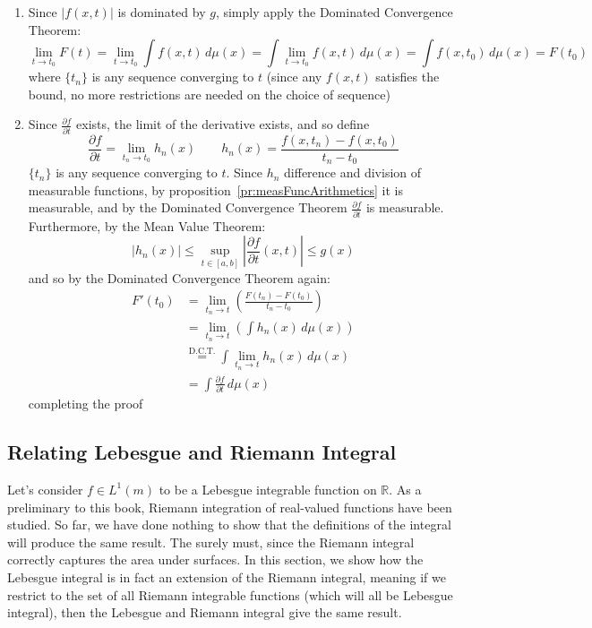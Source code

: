 \documentclass[oneside]{book}
\newcommand{\R}{\mathbb{R}}
\newcommand{\rw}{\rightarrow}
\begin{document}
\begin{Proof}
	\begin{enumerate}
		\item Since $|f(x,t)|$ is dominated by $g$, simply apply the Dominated Convergence Theorem:
			\[
				\lim_{t \rw t_0} F(t) = \lim_{t \rw t_0}\int f(x, t)\,d\mu(x) = \int\lim_{t \rw t_0} f(x, t)\,d\mu(x) = \int
				f(x,t_0)\,d\mu(x) = F(t_0)
			\]
			where $\{t_n\}$ is any sequence converging to $t$ (since any $f(x,t)$ satisfies the bound, no more
			restrictions are needed on the choice of sequence)
		\item Since $\frac{\partial f}{\partial t}$ exists, the limit of the derivative exists, and so define
			\[
				\frac{\partial f}{\partial t} = \lim_{t_n \rw t_0} h_n(x) \qquad h_n(x) = \frac{f(x, t_n) - f(x, t_0)}{t_n - t_0}
			\]
			$\{t_n\}$ is any sequence converging to $t$. Since $h_n$ difference and division of measurable functions, by
			proposition~\ref{pr:measFuncArithmetics} it is measurable, and by the Dominated Convergence Theorem
			$\frac{\partial f}{\partial t}$ is measurable. Furthermore, by the Mean Value Theorem:
			\[
				|h_n(x)| \le \sup_{t \in [a,b]} \left|\frac{\partial f}{\partial t}(x,t)\right| \le g(x)
			\]
			and so by the Dominated Convergence Theorem again:
			\begin{align*}
				F'(t_0) &= \lim_{t_n \rw t} \left(\frac{F(t_n) - F(t_0)}{t_n - t_0}\right)\\
						&= \lim_{t_n \rw t}\left(\int h_n(x)\,d\mu(x)\right)\\
						&\overset{\text{D.C.T.}}{=} \int\lim_{t_n \rw t} h_n(x)\,d\mu(x)\\
						&= \int \frac{\partial f}{\partial t}\,d\mu(x)
			\end{align*}
			completing the proof
	\end{enumerate}
\end{Proof}

\subsection{Relating Lebesgue and Riemann Integral}

Let's consider $f \in L^1(m)$ to be a Lebesgue integrable function on $\R$. As a preliminary to this book, Riemann
integration of real-valued functions have been studied. So far, we have done nothing to show that the definitions of the
integral will produce the same result. The surely must, since the Riemann integral correctly captures the area under
surfaces. In this section, we show how the Lebesgue integral is in fact an extension of the Riemann integral, meaning if
we restrict to the set of all Riemann integrable functions (which will all be Lebesgue integral), then the Lebesgue and
Riemann integral give the same result. 
\end{document}
